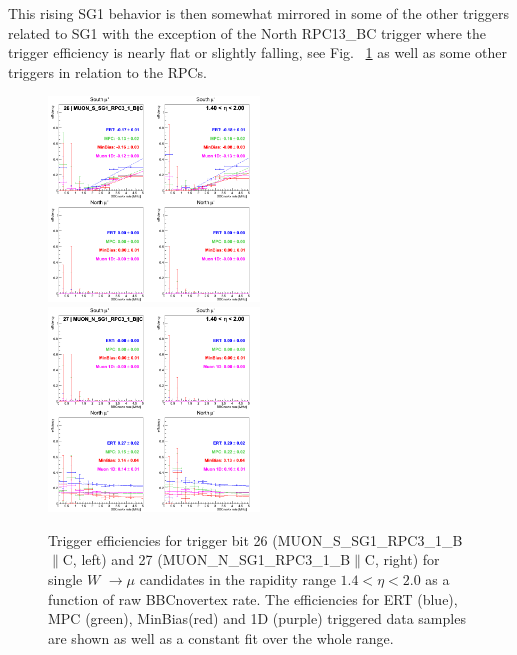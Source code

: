 \clearpage
This rising SG1 behavior is then somewhat mirrored in some of the other triggers
related to SG1 with the exception of the North RPC13\_BC trigger where the
trigger efficiency is nearly flat or slightly falling, see Fig.~
\ref{fig:run13_trigeffirate_trig2627} as well as some other triggers in relation
to the RPCs.
\begin{figure}[h!]

  \centering

  \includegraphics[width=0.5\textwidth]{./figures/run13_trigeffirate_eta1_trig26_lin.png}
  \includegraphics[width=0.5\textwidth]{./figures/run13_trigeffirate_eta1_trig27_lin.png}
  \caption{\label{fig:run13_trigeffirate_trig2627} Trigger efficiencies for trigger bit 26 (MUON\_S\_SG1\_RPC3\_1\_B$\|$C, left) and 27 (MUON\_N\_SG1\_RPC3\_1\_B$\|$C, right) for single $W$ $\rightarrow \mu$ candidates in the rapidity range $ 1.4 < \eta < 2.0$ as a function of raw BBCnovertex rate. The efficiencies for ERT (blue), MPC (green), MinBias(red) and 1D (purple) triggered data samples are shown as well as a constant fit over the whole range.}

\end{figure}
\clearpage
